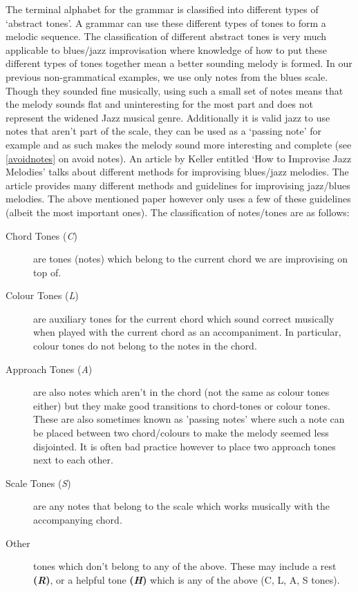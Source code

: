 \documentclass[pdftex,12pt,a4paper]{report}
\begin{document}
The terminal alphabet for the grammar is classified into different types of `abstract tones'. A grammar can use these different types of tones to form a melodic sequence. The classification of different abstract tones is very much applicable to blues/jazz improvisation where knowledge of how to put these different types of tones together mean a better sounding melody is formed. In our previous non-grammatical examples, we use only notes from the blues scale. Though they sounded fine musically, using such a small set of notes means that the melody sounds flat and uninteresting for the most part and does not represent the widened Jazz musical genre. Additionally it is valid jazz to use notes that aren't part of the scale, they can be used as a `passing note' for example and as such makes the melody sound more interesting and complete (see \ref{avoidnotes} on avoid notes). An article by Keller entitled `How to Improvise Jazz Melodies' \cite{jazzkeller} talks about different methods for improvising blues/jazz melodies. The article provides many different methods and guidelines for improvising jazz/blues melodies. The above mentioned paper \cite{keller07} however only uses a few of these guidelines (albeit the most important ones). The classification of notes/tones are as follows:

\begin{description}
  \item[Chord Tones (\textit{C})] are tones (notes) which belong to the current chord we are improvising on top of.
  \item[Colour Tones (\textit{L})] are auxiliary tones for the current chord which sound correct musically when played with the current chord as an accompaniment. In particular, colour tones do not belong to the notes in the chord. 
  \item[Approach Tones (\textit{A})] are also notes which aren't in the chord (not the same as colour tones either) but they make good transitions to chord-tones or colour tones. These are also sometimes known as 'passing notes' where such a note can be placed between two chord/colours to make the melody seemed less disjointed. It is often bad practice however to place two approach tones next to each other.
  \item[Scale Tones (\textit{S})] are any notes that belong to the scale which works musically with the accompanying chord.
  \item[Other] tones which don't belong to any of the above. These may include a rest \textbf{(\textit{R})}, or a helpful tone \textbf{(\textit{H})} which is any of the above (C, L, A, S tones).
\end{description}
\end{document}
